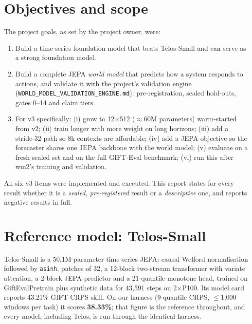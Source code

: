\documentclass[10pt,a4paper]{extarticle}
\newcommand{\code}[1]{\texttt{\small #1}}
\begin{document}
\tableofcontents
\clearpage

\section{Objectives and scope}
The project goals, as set by the project owner, were:
\begin{enumerate}
\item Build a time-series foundation model that beats Telos-Small and can serve as a strong
foundation model.
\item Build a complete JEPA \emph{world model} that predicts how a system responds to actions, and validate it
with the project's validation engine (\code{WORLD\_MODEL\_VALIDATION\_ENGINE.md}): pre-registration, sealed hold-outs,
gates 0--14 and claim tiers.
\item For v3 specifically: (i) grow to 12$\times$512 ($\approx$60M parameters) warm-started from v2;
(ii) train longer with more weight on long horizons; (iii) add a stride-32 path so 8k contexts are affordable;
(iv) add a JEPA objective so the forecaster shares one JEPA backbone with the world model;
(v) evaluate on a fresh sealed set and on the full GIFT-Eval benchmark; (vi) run this after wm2's training and validation.
\end{enumerate}
All six v3 items were implemented and executed. This report states for every result whether it is a
\emph{sealed, pre-registered} result or a \emph{descriptive} one, and reports negative results in full.

\section{Reference model: Telos-Small}
Telos-Small is a 50.1M-parameter time-series JEPA: causal Welford normalisation followed by \code{asinh}, patches of
32, a 12-block two-stream transformer with variate attention, a 2-block JEPA predictor and a 21-quantile monotone head,
trained on GiftEvalPretrain plus synthetic data for 43{,}591 steps on 2$\times$P100. Its model card reports 43.21\% GIFT
CRPS skill. On our harness (9-quantile CRPS, $\le$1{,}000 windows per task) it scores \textbf{38.33\%}; that figure is the
reference throughout, and every model, including Telos, is run through the identical harness.

\end{document}
